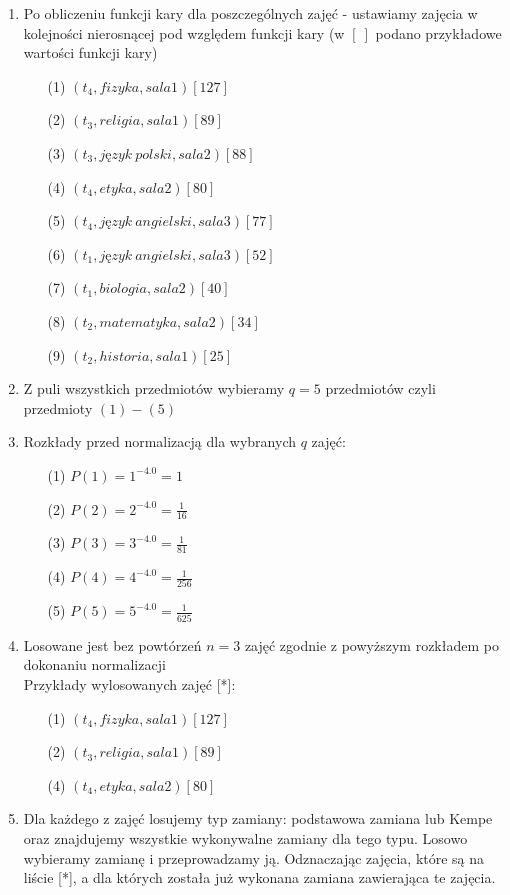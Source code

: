 \begin{enumerate}
\item Po obliczeniu funkcji kary dla poszczególnych zajęć - ustawiamy zajęcia w kolejności nierosnącej pod względem funkcji kary (w $[\ ]$ podano przykładowe wartości funkcji kary)\\
\begin{enumerate}
 \item[(1)] $(t_{4}, fizyka, sala1)[127]$
 \item[(2)] $(t_{3}, religia, sala1)[89]$
 \item[(3)] $(t_{3}, język\ polski, sala2)[88]$
 \item[(4)] $(t_{4}, etyka, sala2)[80]$
 \item[(5)] $(t_{4}, język\ angielski, sala3)[77]$
 \item[(6)] $(t_{1}, język\ angielski, sala3)[52]$
 \item[(7)] $(t_{1}, biologia, sala2)[40]$
 \item[(8)] $(t_{2}, matematyka, sala2)[34]$
 \item[(9)] $(t_{2}, historia, sala1)[25]$
\end{enumerate}
\item Z puli wszystkich przedmiotów wybieramy $q = 5$ przedmiotów czyli przedmioty $(1) - (5)$ 
\item Rozkłady przed normalizacją dla wybranych $q$ zajęć:
	\begin{enumerate}
	\item[(1)] $P(1) = 1^{-4.0} = 1$
 	\item[(2)] $P(2) = 2^{-4.0} = \frac{1}{16}$
 	\item[(3)] $P(3) = 3^{-4.0} = \frac{1}{81}$
 	\item[(4)] $P(4) = 4^{-4.0} = \frac{1}{256}$
 	\item[(5)] $P(5) = 5^{-4.0} = \frac{1}{625}$
	\end{enumerate}
\item Losowane jest bez powtórzeń $n = 3$ zajęć zgodnie z powyższym rozkładem po dokonaniu normalizacji \\
	Przykłady wylosowanych zajęć [*]:
	\begin{enumerate}
	 \item[(1)] $(t_{4}, fizyka, sala1)[127]$
	 \item[(2)] $(t_{3}, religia, sala1)[89]$
	  \item[(4)] $(t_{4}, etyka, sala2)[80]$
	\end{enumerate}
\item Dla każdego z zajęć losujemy typ zamiany: podstawowa zamiana lub Kempe oraz znajdujemy wszystkie wykonywalne zamiany dla tego typu. Losowo wybieramy zamianę i przeprowadzamy ją. Odznaczając zajęcia, które są na liście [*], a dla których została już wykonana zamiana zawierająca te zajęcia.
\end{enumerate}





